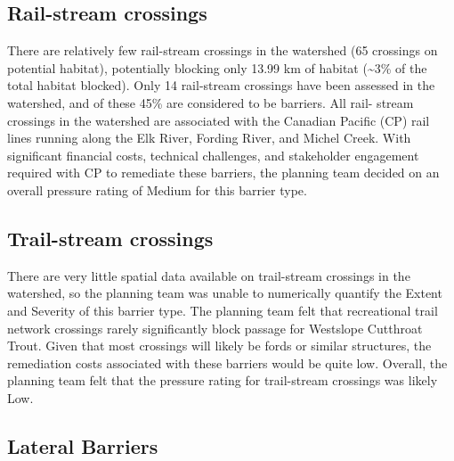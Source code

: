 \documentclass[
  letterpaper,
  DIV=11,
  numbers=noendperiod]{scrreprt}
\begin{document}
\subsection*{Rail-stream crossings}\label{rail-stream-crossings}

There are relatively few rail-stream crossings in the watershed (65
crossings on potential habitat), potentially blocking only 13.99 km of
habitat (\textasciitilde3\% of the total habitat blocked). Only 14
rail-stream crossings have been assessed in the watershed, and of these
45\% are considered to be barriers. All rail- stream crossings in the
watershed are associated with the Canadian Pacific (CP) rail lines
running along the Elk River, Fording River, and Michel Creek. With
significant financial costs, technical challenges, and stakeholder
engagement required with CP to remediate these barriers, the planning
team decided on an overall pressure rating of Medium for this barrier
type.

\subsection*{Trail-stream crossings}\label{trail-stream-crossings}

There are very little spatial data available on trail-stream crossings
in the watershed, so the planning team was unable to numerically
quantify the Extent and Severity of this barrier type. The planning team
felt that recreational trail network crossings rarely significantly
block passage for Westslope Cutthroat Trout. Given that most crossings
will likely be fords or similar structures, the remediation costs
associated with these barriers would be quite low. Overall, the planning
team felt that the pressure rating for trail-stream crossings was likely
Low.

\subsection*{Lateral Barriers}\label{lateral-barriers}
\end{document}
